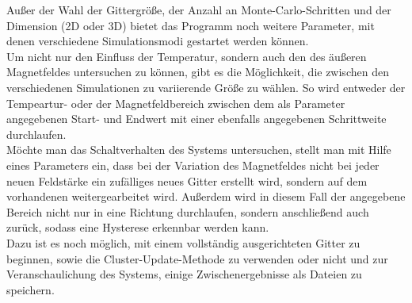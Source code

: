 Außer der Wahl der Gittergröße, der Anzahl an Monte-Carlo-Schritten und der Dimension (2D oder 3D) bietet das Programm noch weitere Parameter, mit denen verschiedene Simulationsmodi gestartet werden können.\\
Um nicht nur den Einfluss der Temperatur, sondern auch den des äußeren Magnetfeldes untersuchen zu können, gibt es die Möglichkeit, die zwischen den verschiedenen Simulationen zu variierende Größe zu wählen. So wird entweder der Tempeartur- oder der Magnetfeldbereich zwischen dem als Parameter angegebenen Start- und Endwert mit einer ebenfalls angegebenen Schrittweite durchlaufen.\\
Möchte man das Schaltverhalten des Systems untersuchen, stellt man mit Hilfe eines Parameters ein, dass bei der Variation des Magnetfeldes nicht bei jeder neuen Feldstärke ein zufälliges neues Gitter erstellt wird, sondern auf dem vorhandenen weitergearbeitet wird. Außerdem wird in diesem Fall der angegebene Bereich nicht nur in eine Richtung durchlaufen, sondern anschließend auch zurück, sodass eine Hysterese erkennbar werden kann.\\
Dazu ist es noch möglich, mit einem vollständig ausgerichteten Gitter zu beginnen, sowie die Cluster-Update-Methode zu verwenden oder nicht und zur Veranschaulichung des Systems, einige Zwischenergebnisse als Dateien zu speichern.
